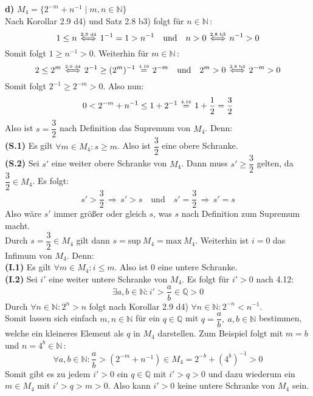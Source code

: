 \documentclass[a4paper,graphics,11pt]{article}
\newcommand{\up}[2]{\mathrel{\overset{\makebox[0pt]{\mbox{\normalfont\tiny #2}}}{#1}}}
\begin{document}
\textbf{d)} $M_4 = \{2^{-m}+n^{-1}\mid m,n \in \mathbb{N}\}$\\[5pt]
Nach Korollar 2.9 d4) und Satz 2.8 b3) folgt für $n \in \mathbb{N}$\,:
$$
    1\leq n \up{\,\Longleftrightarrow\,}{2.9 d4} 1^{-1} = 1 > n^{-1} \quad\text{und}\quad
    n>0 \up{\,\Longleftrightarrow\,}{2.8 b3} n^{-1} > 0
$$
Somit folgt $1 \geq n^{-1} > 0$. Weiterhin für $m \in \mathbb{N}$\,:
$$
    2 \leq 2^m \up{\,\Longleftrightarrow\,}{2.9 d4} 2^{-1} \geq (2^{m})^{-1} \up{\ =\ }{4.16} 2^{-m} \quad\text{und}\quad 2^m > 0 \up{\,\Longleftrightarrow\,}{2.8 b3} 2^{-m} > 0
$$
Somit folgt $2^{-1} \geq 2^{-m}>0$. Also nun:
$$
    0<2^{-m} + n^{-1} \leq 1 + 2^{-1} \up{\ =\ }{4.16} 1+\frac{1}{2} = \frac{3}{2}
$$
Also ist $s=\dfrac{3}{2}$ nach Definition das Supremum von $M_4$. Denn:\\
\textbf{(S.1)} Es gilt $\forall m \in M_4 \colon s \geq m$. Also ist $\dfrac{3}{2}$ eine obere Schranke.\\[2pt]
\textbf{(S.2)} Sei $s'$ eine weiter obere Schranke von $M_4$. Dann muss
$s'\geq\dfrac{3}{2}$ gelten, da $\dfrac{3}{2}\in M_4$. Es folgt:
$$
    s' > \frac{3}{2} \,\Longrightarrow\, s'>s\quad\text{und}\quad s'
    = \dfrac{3}{2} \,\Longrightarrow\, s' = s
$$
Also wäre $s'$ immer größer oder gleich $s$, was $s$ nach Definition zum Supremum macht.\\[2pt]
Durch $s =\dfrac{3}{2} \in M_4$ gilt dann $s =\text{sup}\ M_4 = \text{max}\ M_4$.
\newpage
Weiterhin ist $i = 0$ das Infimum von $M_4$. Denn:\\[5pt]
\textbf{(I.1)} Es gilt $\forall m \in M_4\colon i \leq m$. Also ist 0 eine untere Schranke.\\[5pt]
\textbf{(I.2)} Sei $i'$ eine weiter untere Schranke von $M_4$. Es folgt für $i' > 0$ nach 4.12:
$$
    \exists a,b \in \mathbb{N}\colon i' > \frac{a}{b}\in \mathbb{Q} >0
$$
Durch $\forall n \in \mathbb{N}\colon 2^n > n$ folgt nach Korollar 2.9 d4)
$\forall n \in \mathbb{N}\colon 2^{-n} < n^{-1}$.\\
Somit lassen sich einfach $m,n \in \mathbb{N}$ für ein $q \in \mathbb{Q}$ mit
$q = \dfrac{a}{b},\ a,b \in \mathbb{N}$ bestimmen, welche ein
kleineres Element als $q$ in $M_4$ darstellen. Zum Beispiel folgt mit $m = b$ und
$n=4^b \in \mathbb{N}$\,:
$$
    \forall a,b \in \mathbb{N}\colon \frac{a}{b}
    > (2^{-m} + n^{-1}) \in M_4 = 2^{-b} + (4^{b})^{-1} > 0
$$
Somit gibt es zu jedem $i' > 0$ ein $q \in \mathbb{Q}$ mit $i'>q>0$ und dazu wiederum ein
$m\in M_4$ mit $i'>q>m>0$. Also kann $i' > 0$ keine untere Schranke von $M_4$ sein.
\end{document}
